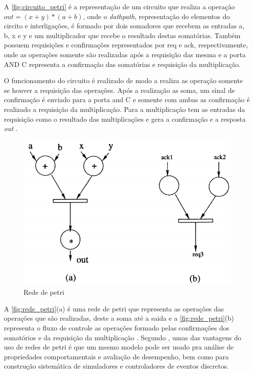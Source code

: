 \par
A \autoref{fig:circuito_petri} é a representação de um circuito que realiza a operação $out=(x+y)*(a+b)$, onde o \textit{dathpath}, representação do elementos do circito e interligações, é formado por dois somadores que recebem as entradas a, b, x e y e um multiplicador que recebe o resultado destas somatórias. Também possuem requisições e confirmações representados por req e ack, respectivamente, onde as operações somente são realizadas após a requisição das mesma e a porta AND C representa a confirmação das somatórias e requisição da multiplicação\cite{yakovlev1996petri}.

\par
O funcionamento do circuito é realizado de modo a realiza as operação somente se houver a requisição das operações. Após a realização as soma, um sinal de confirmação é enviado para a porta and C e somente com ambas as confirmação é realizado a requisição da multiplicação. Para a multiplicação tem as entradas da requisição como o resultado das multiplicações e gera a confirmação e a resposta \textit{out} \cite{yakovlev1996petri}.

\begin{figure}[H]
	\begin{center}
    \caption{\label{fig:rede_petri}Rede de petri}
	\includegraphics[scale=0.50]{Figuras/Rede_petri.png}
	\end{center}
\end{figure}

A \autoref{fig:rede_petri}(a) é uma rede de petri que representa as operações das operações que são realizadas, deste a soma até a saida e a \autoref{fig:rede_petri}(b) representa o fluxo de controle as operações formado pelas confirmações dos somatórios e da requisição da multiplicação \cite{yakovlev1996petri}. Segundo , umas das vantagens do uso de redes de petri é que um mesmo modelo pode ser usado pra análise de propriedades comportamentais e avaliação de desempenho, bem como para construção sistemática de simuladores e controladores de eventos discretos.

